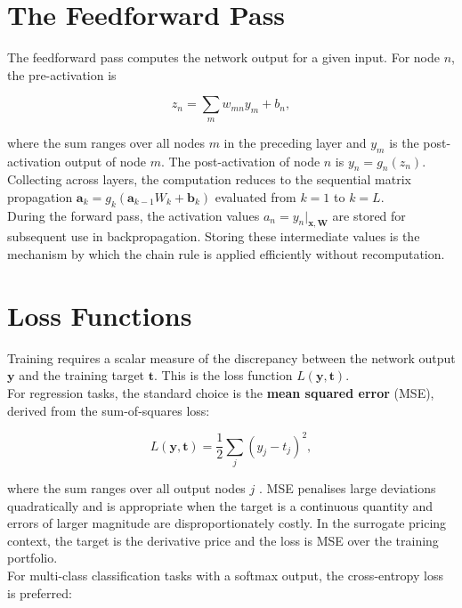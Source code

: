     \section*{The Feedforward Pass}

    The feedforward pass computes the network output for a given input. For node $n$, the pre-activation is

    \[
    z_n = \sum_{m} w_{mn} y_m + b_n,
    \]

    \noindent
    where the sum ranges over all nodes $m$ in the preceding layer and $y_m$ is the post-activation output of node $m$. The post-activation of node $n$ is $y_n = g_n(z_n)$. Collecting across layers, the computation reduces to the
    sequential matrix propagation $\mathbf{a}_k = g_k(\mathbf{a}_{k-1} W_k + \mathbf{b}_k)$ evaluated from $k = 1$ to $k = L$. \\

    \noindent
    During the forward pass, the activation values $a_n = y_n|_{\mathbf{x}, \mathbf{W}}$ are stored for subsequent use in backpropagation. Storing these intermediate values is the mechanism by which the chain rule is applied efficiently without recomputation. \\

    \section*{Loss Functions}

    Training requires a scalar measure of the discrepancy between the network output $\mathbf{y}$ and the training target $\mathbf{t}$. This is the loss function $L(\mathbf{y}, \mathbf{t})$. \\

    \noindent 
    For regression tasks, the standard choice is the \textbf{mean squared error} (MSE), derived from the sum-of-squares loss:

    \[
    L(\mathbf{y}, \mathbf{t}) = \frac{1}{2} \sum_{j} (y_j - t_j)^2,
    \]

    \noindent 
    where the sum ranges over all output nodes $j$ \citep{goodfellow2016deep}. MSE penalises large deviations quadratically and is appropriate when the target is a continuous quantity and errors of larger magnitude are disproportionately costly. In the surrogate pricing context, the target is the derivative price and the loss is MSE over the training portfolio. \\

    \noindent 
    For multi-class classification tasks with a softmax output, the cross-entropy loss is preferred:

